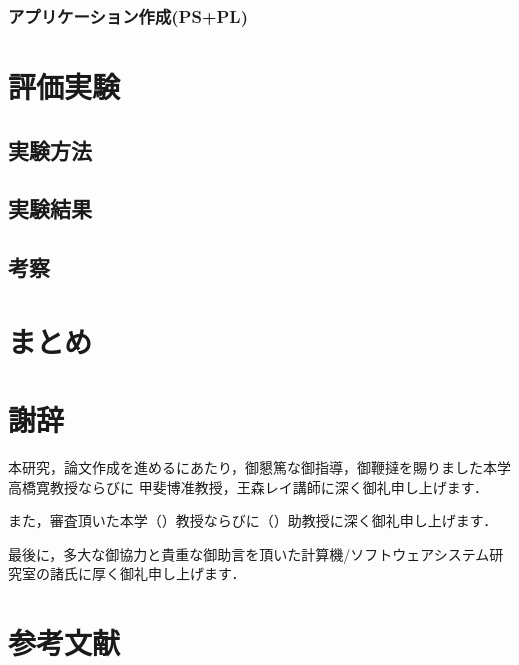 \documentclass[11pt,a4j]{jreport}
\begin{document}
 \subsection{アプリケーション作成(PS+PL)}

\chapter{評価実験}
\section{実験方法}
\section{実験結果}
\section{考察}

\chapter{まとめ}

\chapter*{謝辞} %
本研究，論文作成を進めるにあたり，御懇篤な御指導，御鞭撻を賜りました本学高橋寛教授ならびに
甲斐博准教授，王森レイ講師に深く御礼申し上げます．

また，審査頂いた本学（）教授ならびに（）助教授に深く御礼申し上げます．

最後に，多大な御協力と貴重な御助言を頂いた計算機/ソフトウェアシステム研究室の諸氏に厚く御礼申し上げます．
\chapter*{参考文献}
\renewcommand{\bibname}{参考文献} %
\end{document}
